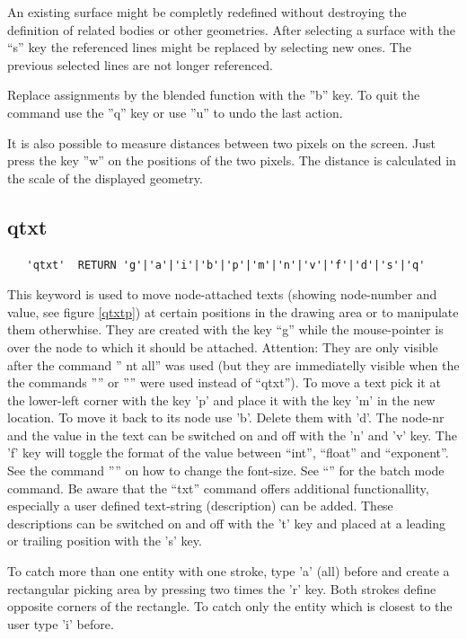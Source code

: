 \documentclass{article}
\begin{document}
An existing surface might be completly redefined without destroying the definition of related bodies or other geometries. After selecting a surface with the ``s'' key the referenced lines might be replaced by selecting new ones. The previous selected lines are not longer referenced.

Replace assignments by the blended function with the ''b'' key. To quit the command use the ''q'' key or use ''u'' to undo the last action. 

It is also possible to measure distances between two pixels on the screen. Just press the key ''w'' on the positions of the two pixels. The distance is calculated in the scale of the displayed geometry. 

\subsection{\label{qtxt}qtxt}
\begin{verbatim}
   'qtxt'  RETURN 'g'|'a'|'i'|'b'|'p'|'m'|'n'|'v'|'f'|'d'|'s'|'q' 
\end{verbatim}
This keyword is used to move node-attached texts (showing node-number and value, see figure \ref{qtxtp}) at certain positions in the drawing area or to manipulate them otherwhise. They are created with the key ``g'' while the mouse-pointer is over the node to which it should be attached. Attention: They are only visible after the command '' nt all'' was used (but they are immediatelly visible when the the commands '''' or '''' were used instead of ``qtxt''). To move a text pick it at the lower-left corner with the key 'p' and place it with the key 'm' in the new location. To move it back to its node use 'b'. Delete them with 'd'. The node-nr and the value in the text can be switched on and off with the 'n' and 'v' key. The 'f' key will toggle the format of the value between ``int'', ``float'' and ``exponent''. See the command '''' on how to change the font-size. See ``'' for the batch mode command. Be aware that the ``txt'' command offers additional functionallity, especially a user defined text-string (description) can be added. These descriptions can be switched on and off with the 't' key and placed at a leading or trailing position with the 's' key.

To catch more than one entity with one stroke, type 'a' (all) before and create a rectangular picking area by pressing two times the 'r' key. Both strokes define opposite corners of the rectangle. To catch only the entity which is closest to the user type 'i' before.
  
\end{document}

